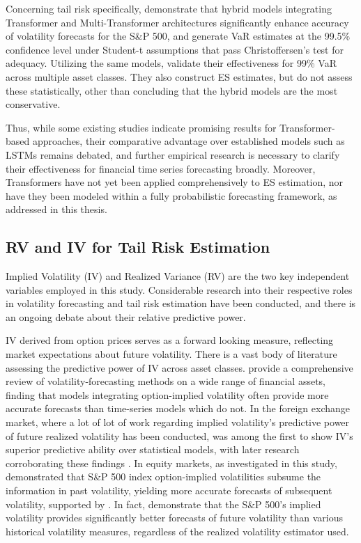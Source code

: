 Concerning tail risk specifically, \textcite{ramos2021multi} demonstrate that hybrid models integrating Transformer and Multi-Transformer architectures significantly enhance accuracy of volatility forecasts for the S\&P 500, and generate VaR estimates at the 99.5\% confidence level under Student-t assumptions that pass Christoffersen's test for adequacy. Utilizing the same models, \textcite{mishra2024volatility} validate their effectiveness for 99\% VaR across multiple asset classes. They also construct ES estimates, but do not assess these statistically, other than concluding that the hybrid models are the most conservative. 

Thus, while some existing studies indicate promising results for Transformer-based approaches, their comparative advantage over established models such as LSTMs remains debated, and further empirical research is necessary to clarify their effectiveness for financial time series forecasting broadly. Moreover, Transformers have not yet been applied comprehensively to ES estimation, nor have they been modeled within a fully probabilistic forecasting framework, as addressed in this thesis.

\subsection{RV and IV for Tail Risk Estimation}
\label{sec:2.4_rv_iv}

Implied Volatility (IV) and Realized Variance (RV) are the two key independent variables employed in this study. Considerable research into their respective roles in volatility forecasting and tail risk estimation have been conducted, and there is an ongoing debate about their relative predictive power.

IV derived from option prices serves as a forward looking measure, reflecting market expectations about future volatility. There is a vast body of literature assessing the predictive power of IV across asset classes. \textcite{Poon2005} provide a comprehensive review of volatility-forecasting methods on a wide range of financial assets, finding that models integrating option-implied volatility often provide more accurate forecasts than time-series models which do not. In the foreign exchange market, where a lot of lot of work regarding implied volatility's predictive power of future realized volatility has been conducted, \textcite{JORION1995} was among the first to show IV's superior predictive ability over statistical models, with later research corroborating these findings \parencite{Charoenwong2009, Busch2011, Plhal2021}. In equity markets, as investigated in this study, \textcite{Christensen1998} demonstrated that S\&P 500 index option-implied volatilities subsume the information in past volatility, yielding more accurate forecasts of subsequent volatility, supported by \textcite{Fleming1998, Blair2001, shu2001relation}. In fact, \textcite{shu2001relation} demonstrate that the S\&P 500’s implied volatility provides significantly better forecasts of future volatility than various historical volatility measures, regardless of the realized volatility estimator used.

